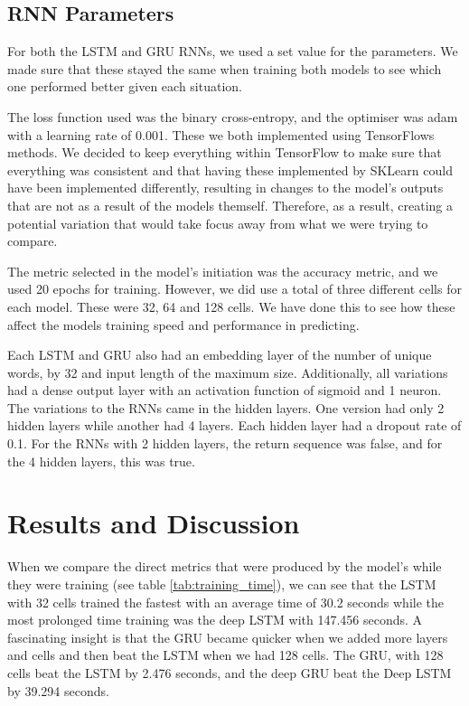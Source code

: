 \documentclass[a4paper,10pt]{article}
\begin{document}
	

\subsection{RNN Parameters}
	For both the LSTM and GRU RNNs, we used a set value for the parameters. We made sure that these stayed the same when training both models to see which one performed better given each situation. 
	
	The loss function used was the binary cross-entropy, and the optimiser was adam with a learning rate of 0.001. These we both implemented using TensorFlows methods. We decided to keep everything within TensorFlow to make sure that everything was consistent and that having these implemented by SKLearn could have been implemented differently, resulting in changes to the model's outputs that are not as a result of the models themself. Therefore, as a result, creating a potential variation that would take focus away from what we were trying to compare.
	
	The metric selected in the model's initiation was the accuracy metric, and we used 20 epochs for training. However, we did use a total of three different cells for each model. These were 32, 64 and 128 cells. We have done this to see how these affect the models training speed and performance in predicting.  
	
	Each LSTM and GRU also had an embedding layer of the number of unique words, by 32 and input length of the maximum size. Additionally, all variations had a dense output layer with an activation function of sigmoid and 1 neuron. The variations to the RNNs came in the hidden layers. One version had only 2 hidden layers while another had 4 layers. Each hidden layer had a dropout rate of 0.1. For the RNNs with 2 hidden layers, the return sequence was false, and for the 4 hidden layers, this was true.

\section{Results and Discussion}

	When we compare the direct metrics that were produced by the model's while they were training (see table \ref{tab:training_time}), we can see that the LSTM with 32 cells trained the fastest with an average time of 30.2 seconds while the most prolonged time training was the deep LSTM with 147.456 seconds. A fascinating insight is that the GRU became quicker when we added more layers and cells and then beat the LSTM when we had 128 cells. The GRU, with 128 cells beat the LSTM by 2.476 seconds, and the deep GRU beat the Deep LSTM by 39.294 seconds.
\end{document}
